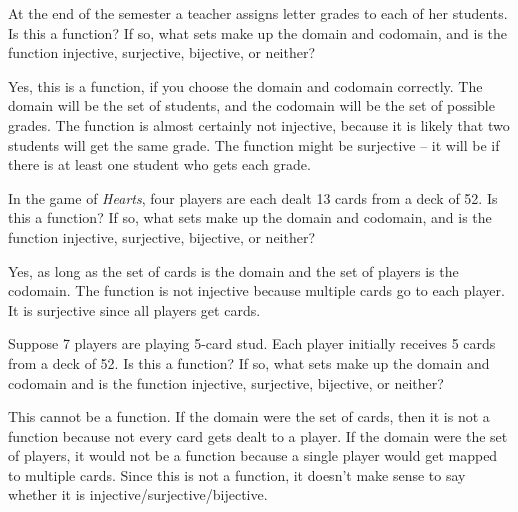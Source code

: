 \begin{questions}
\begin{answer}
	\end{answer}
	
	
	
\question At the end of the semester a teacher assigns letter grades to each of her students.  Is this a function?  If so, what sets make up the domain and codomain, and is the function injective, surjective, bijective, or neither?

	\begin{answer}
	   Yes, this is a function, if you choose the domain and codomain correctly.  The domain will be the set of students, and the codomain will be the set of possible grades.  The function is almost certainly not injective, because it is likely that two students will get the same grade.  The function might be surjective -- it will be if there is at least one student who gets each grade.
	\end{answer}
	
	
	
\question In the game of {\em Hearts}, four players are each dealt 13 cards from a deck of 52.  Is this a function?  If so, what sets make up the domain and codomain, and is the function injective, surjective, bijective, or neither?

	\begin{answer}
		Yes, as long as the set of cards is the domain and the set of players is the codomain.  The function is not injective because multiple cards go to each player.  It is surjective since all players get cards.
	\end{answer}
	
	
\question Suppose 7 players are playing 5-card stud.  Each player initially receives 5 cards from a deck of 52.  Is this a function?  If so, what sets make up the domain and codomain and is the function injective, surjective, bijective, or neither?
	
	\begin{answer}
	  This cannot be a function.  If the domain were the set of cards, then it is not a function because not every card gets dealt to a player.  If the domain were the set of players, it would not be a function because a single player would get mapped to multiple cards.  Since this is not a function, it doesn't make sense to say whether it is injective/surjective/bijective.
	\end{answer}

\end{questions}
